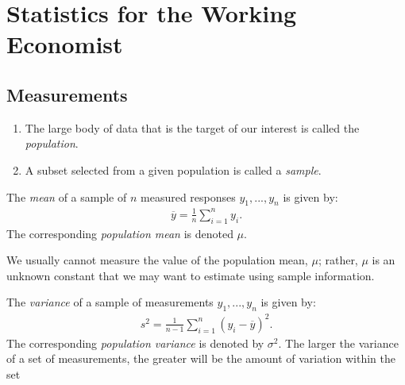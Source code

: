 \chapter{Statistics for the Working Economist}

\section{Measurements}
    \begin{definition}
        \phantom{a}
        \begin{enumerate}[label = (\arabic*),itemsep=1pt,topsep=3pt]
            \item The large body of data that is the target of our interest is called the \textit{population}.
            \item A subset selected from a given population is called a \textit{sample}.
        \end{enumerate}
    \end{definition}

    \begin{definition}
        The \textit{mean} of a sample of $n$ measured responses $y_1,...,y_n$ is given by:
            \begin{equation*}
            \begin{split}
                \overline{y} = \frac{1}{n} \sum_{i = 1}^n y_i.
            \end{split}
            \end{equation*}
        The corresponding \textit{population mean} is denoted $\mu$.
    \end{definition}

    \begin{remark}
        We usually cannot measure the value of the population mean, $\mu$; rather, $\mu$ is an unknown constant that we may want to estimate using sample information.
    \end{remark}

    \begin{definition}
        The \textit{variance} of a sample of measurements $y_1,...,y_n$ is given by:
            \begin{equation*}
            \begin{split}
                s^2 = \frac{1}{n-1}\sum_{i = 1}^n (y_i - \overline{y})^2.
            \end{split}
            \end{equation*}
        The corresponding \textit{population variance} is denoted by $\sigma^2$. The larger the variance of a set of measurements, the greater will be the amount of variation within the set
    \end{definition}

